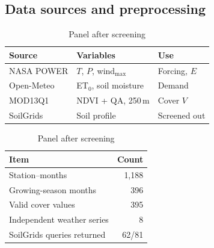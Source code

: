 \documentclass{mcmthesis}
\begin{document}
\subsection{Data sources and preprocessing}
\begin{table}[H]
\centering\footnotesize
\begin{minipage}[t]{0.55\linewidth}\centering
\caption{Sources and use}\label{tab:data-src}
\begin{tabular}{@{}lll@{}}
\toprule
Source & Variables & Use \\ \midrule
NASA POWER \cite{REF17} & $T$, $P$, wind$_{\max}$ & Forcing, $E$ \\
Open-Meteo \cite{REF19} & ET$_0$, soil moisture & Demand \\
MOD13Q1 \cite{REF18} & NDVI + QA, 250\,m & Cover $V$ \\
SoilGrids \cite{EN09} & Soil profile & Screened out \\ \bottomrule
\end{tabular}
\end{minipage}\hfill
\begin{minipage}[t]{0.45\linewidth}\centering
\caption{Panel after screening}\label{tab:data-qc}
\begin{tabular}{@{}lr@{}}
\toprule
Item & Count \\ \midrule
Station--months & 1,188 \\
Growing-season months & 396 \\
Valid cover values & 395 \\
Independent weather series & 8 \\
SoilGrids queries returned & 62/81 \\ \bottomrule
\end{tabular}
\end{minipage}
\end{table}
\end{document}
